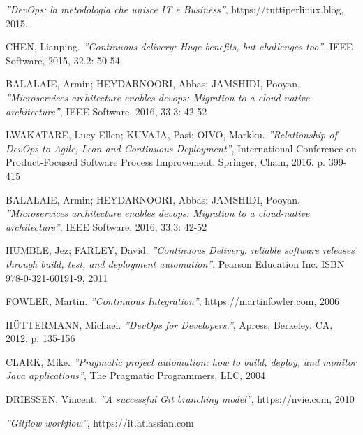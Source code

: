 \documentclass[a4paper, 12pt]{report}
\numberwithin{equation}{section}
\begin{document}
\begin{thebibliography}{9}
            \emph{''DevOps: la metodologia che unisce IT e Business''},
            https://tuttiperlinux.blog, 2015.
            
        CHEN, Lianping.
            \emph{''Continuous delivery: Huge benefits, but challenges too''},
            IEEE Software, 2015, 32.2: 50-54
            
        BALALAIE, Armin; HEYDARNOORI, Abbas; JAMSHIDI, Pooyan.
            \emph{''Microservices architecture enables devops: Migration to a cloud-native architecture''},
            IEEE Software, 2016, 33.3: 42-52
            
        LWAKATARE, Lucy Ellen; KUVAJA, Pasi; OIVO, Markku.
            \emph{''Relationship of DevOps to Agile, Lean and Continuous Deployment''},
            International Conference on Product-Focused Software Process Improvement. Springer, Cham, 2016. p. 399-415
            
        BALALAIE, Armin; HEYDARNOORI, Abbas; JAMSHIDI, Pooyan.
            \emph{''Microservices architecture enables devops: Migration to a cloud-native architecture''},
            IEEE Software, 2016, 33.3: 42-52
        
        HUMBLE, Jez; FARLEY, David.
            \emph{''Continuous Delivery: reliable software releases through build, test, and deployment automation''},
            Pearson Education Inc. ISBN 978-0-321-60191-9, 2011
            
        FOWLER, Martin.
            \emph{''Continuous Integration''},
            https://martinfowler.com, 2006
        
        HÜTTERMANN, Michael. 
            \emph{''DevOps for Developers.''},
            Apress, Berkeley, CA, 2012. p. 135-156
            
        CLARK, Mike.
            \emph{''Pragmatic project automation: how to build, deploy, and monitor Java applications''},
            The Pragmatic Programmers, LLC, 2004
            
        DRIESSEN, Vincent.
            \emph{''A successful Git branching model''},
            https://nvie.com, 2010
            
            \emph{''Gitflow workflow''},
            https://it.atlassian.com  
            

\end{thebibliography}
\end{document}
